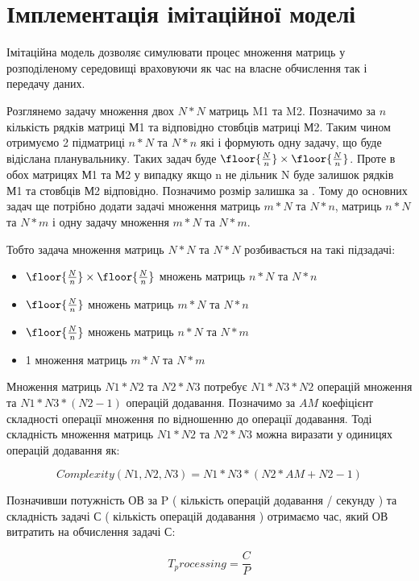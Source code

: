 \section{Імплементація імітаційної моделі}

Імітаційна модель дозволяє симулювати процес множення матриць у розподіленому середовищі враховуючи як час на власне обчислення так і передачу даних.

Розглянемо задачу множення двох $N*N$ матриць M1 та M2. Позначимо за $n$ кількість рядків матриці М1 та відповідно стовбців матриці М2. Таким чином отримуємо 2 підматриці $n*N$ та $N*n$ які і формують одну задачу, що буде відіслана планувальнику. Таких задач буде $ \floor{ \frac{N}{n} } \times \floor{ \frac{N}{n} } $. Проте в обох матрицях М1 та М2 у випадку якщо n не дільник N буде залишок рядків М1 та стовбців М2 відповідно. Позначимо розмір залишка за  . Тому до основних задач ще потрібно додати задачі множення матриць $m*N$ та $N*n$, матриць $n*N$ та $N*m$ і одну задачу множення  $m*N$ та $N*m$.

Тобто задача множення матриць $N*N$ та $N*N$ розбивається на такі підзадачі:
\begin{itemize}
	\item $ \floor{ \frac{N}{n} } \times \floor{ \frac{N}{n} } $ множень матриць $n*N$ та $N*n$ 
	\item $ \floor{ \frac{N}{n} } $ множень матриць $m*N$ та $N*n$ 
	\item $ \floor{ \frac{N}{n} } $ множень матриць $n*N$ та $N*m$ 
	\item 1 множення матриць $m*N$ та $N*m$ 
\end{itemize}

Множення матриць $N1*N2$ та $N2*N3$ потребує $N1*N3*N2$ операцій множення та $N1*N3*(N2-1)$ операцій додавання. Позначимо за $AM$ коефіцієнт складності операції множення по відношенню до операції додавання. Тоді складність множення матриць $N1*N2$ та $N2*N3$ можна виразати у одиницях операцій додавання як:

\begin{equation}
\label{eq:complexity_fmla}
Complexity(N1,N2,N3) = N1*N3*( N2 *AM + N2 - 1)
\end{equation}

Позначивши потужність ОВ за P ( кількість операцій додавання / секунду ) та складність задачі С ( кількість операцій додавання ) отримаємо час, який ОВ витратить на обчислення задачі С:

\begin{equation}
\label{eq:processing_time_simple}
T_processing = \frac{C}{P}
\end{equation}

